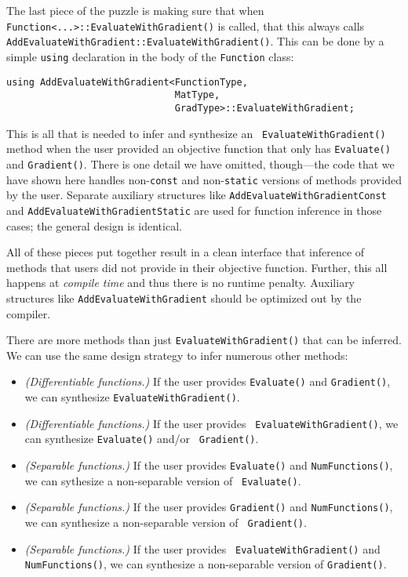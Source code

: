 The last piece of the puzzle is making sure that when {\tt
Function<...>::EvaluateWithGradient()} is called, that this always calls {\tt
AddEvaluateWithGradient::EvaluateWithGradient()}.  This can be done by a simple
{\tt using} declaration in the body of the {\tt Function} class:

\begin{verbatim}
using AddEvaluateWithGradient<FunctionType,
                              MatType,
                              GradType>::EvaluateWithGradient;
\end{verbatim}

This is all that is needed to infer and synthesize an {\tt
EvaluateWithGradient()} method when the user provided an objective function that
only has {\tt Evaluate()} and {\tt Gradient()}.  There is one detail we have
omitted, though---the code that we have shown here handles non-{\tt const}
and non-{\tt static} versions of methods provided by the user.  Separate
auxiliary structures like {\tt AddEvaluateWithGradientConst} %
and {\tt AddEvaluateWithGradientStatic} %
are used for function inference in those cases; the general design is identical.

All of these pieces put together result in a clean interface that inference of
methods that users did not provide in their objective function.  Further, this
all happens at {\it compile time} and thus there is no runtime penalty.
Auxiliary structures like {\tt AddEvaluateWithGradient} should be optimized out
by the compiler.

There are more methods than just {\tt EvaluateWithGradient()} that can be
inferred.  We can use the same design strategy to infer numerous other methods:

\begin{itemize}
  \item {\it (Differentiable functions.)}  If the user provides {\tt Evaluate()}
and {\tt Gradient()}, we can synthesize {\tt EvaluateWithGradient()}.

  \item {\it (Differentiable functions.)}  If the user provides {\tt
EvaluateWithGradient()}, we can synthesize {\tt Evaluate()} and/or {\tt
Gradient()}.

  \item {\it (Separable functions.)}  If the user provides {\tt Evaluate()} and
{\tt NumFunctions()}, we can sythesize a non-separable version of {\tt
Evaluate()}.

  \item {\it (Separable functions.)}  If the user provides {\tt Gradient()} and
{\tt NumFunctions()}, we can synthesize a non-separable version of {\tt
Gradient()}.

  \item {\it (Separable functions.)}  If the user provides {\tt
EvaluateWithGradient()} and {\tt NumFunctions()}, we can synthesize a
non-separable version of {\tt Gradient()}.

\end{itemize}
